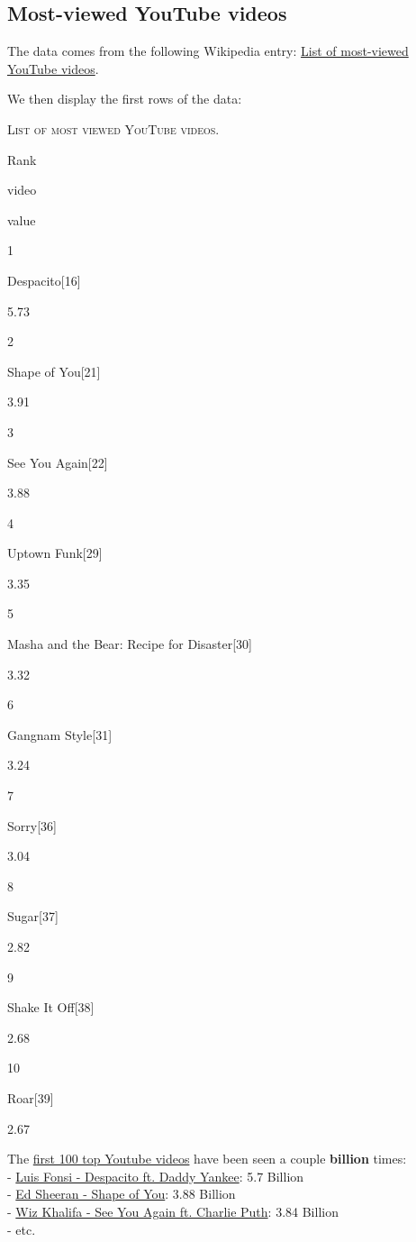 \documentclass[]{book}
\theoremstyle{definition}
\theoremstyle{definition}
\theoremstyle{definition}
\theoremstyle{remark}
\begin{document}
\subsection{Most-viewed YouTube
videos}\label{most-viewed-youtube-videos}

The data comes from the following Wikipedia entry:
\href{https://en.wikipedia.org/wiki/List_of_most-viewed_YouTube_videos}{List
of most-viewed YouTube videos}.



We then display the first rows of the data:

\label{tab:most-viewed-youtube}\textsc{List of most viewed YouTube videos.}

Rank

video

value

1

Despacito{[}16{]}

5.73

2

Shape of You{[}21{]}

3.91

3

See You Again{[}22{]}

3.88

4

Uptown Funk{[}29{]}

3.35

5

Masha and the Bear: Recipe for Disaster{[}30{]}

3.32

6

Gangnam Style{[}31{]}

3.24

7

Sorry{[}36{]}

3.04

8

Sugar{[}37{]}

2.82

9

Shake It Off{[}38{]}

2.68

10

Roar{[}39{]}

2.67

The
\href{https://www.youtube.com/watch?v=kJQP7kiw5Fk\&list=PLirAqAtl_h2r5g8xGajEwdXd3x1sZh8hC}{first
100 top Youtube videos} have been seen a couple \textbf{billion}
times:\\
-
\href{https://www.youtube.com/watch?v=kJQP7kiw5Fk\&list=PLirAqAtl_h2r5g8xGajEwdXd3x1sZh8hC}{Luis
Fonsi - Despacito ft. Daddy Yankee}: 5.7 Billion\\
-
\href{https://www.youtube.com/watch?v=JGwWNGJdvx8\&list=PLirAqAtl_h2r5g8xGajEwdXd3x1sZh8hC\&index=2}{Ed
Sheeran - Shape of You}: 3.88 Billion\\
-
\href{https://www.youtube.com/watch?v=RgKAFK5djSk\&list=PLirAqAtl_h2r5g8xGajEwdXd3x1sZh8hC\&index=3}{Wiz
Khalifa - See You Again ft. Charlie Puth}: 3.84 Billion\\
- etc.
\end{document}
